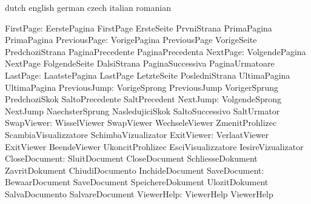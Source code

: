 \stopelements




\startvariables            dutch                     english
                           german                    czech
                           italian                   romanian

                FirstPage: EerstePagina              FirstPage
                           ErsteSeite                PrvniStrana
                           PrimaPagina               PrimaPagina
             PreviousPage: VorigePagina              PreviousPage
                           VorigeSeite               PredchoziStrana
                           PaginaPrecedente          PaginaPrecedenta
                 NextPage: VolgendePagina            NextPage
                           FolgendeSeite             DalsiStrana
                           PaginaSuccessiva          PaginaUrmatoare
                 LastPage: LaatstePagina             LastPage
                           LetzteSeite               PosledniStrana
                           UltimaPagina              UltimaPagina
             PreviousJump: VorigeSprong              PreviousJump
                           VorigerSprung             PredchoziSkok
                           SaltoPrecedente           SaltPrecedent
                 NextJump: VolgendeSprong            NextJump
                           NaechsterSprung           NasledujiciSkok
                           SaltoSuccessivo           SaltUrmator
               SwapViewer: WisselViewer              SwapViewer
                           WechseleViewer            ZmenitProhlizec
                           ScambiaVisualizzatore     SchimbaVizualizator
               ExitViewer: VerlaatViewer             ExitViewer
                           BeendeViewer              UkoncitProhlizec
                           EsciVisualizzatore        IesireVizualizator
            CloseDocument: SluitDocument             CloseDocument
                           SchliesseDokument         ZavritDokument
                           ChiudiDocumento           InchideDocument
             SaveDocument: BewaarDocument            SaveDocument
                           SpeichereDokument         UlozitDokument
                           SalvaDocumento            SalvareDocument
               ViewerHelp: ViewerHelp                ViewerHelp

